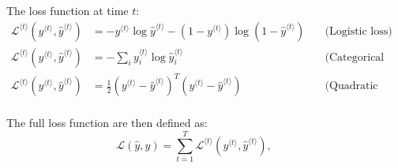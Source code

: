 \documentclass[a4paper, 12pt]{report}
\begin{document}
The loss function at time $t$:
\begin{equation}
\begin{array}{lll}
\mathcal L^{\langle t\rangle}(y^{\langle t\rangle}, \hat y^{\langle t\rangle}) &= -y^{\langle t\rangle}\log\hat y^{\langle t\rangle} - (1-y^{\langle t\rangle})\log(1-\hat y^{\langle t\rangle})\quad&\text{(Logistic loss)} \\
\mathcal L^{\langle t\rangle}(y^{\langle t\rangle}, \hat y^{\langle t\rangle}) &= -\sum_i y_i^{\langle t\rangle}\log\hat y_i^{\langle t\rangle}\quad&\text{(Categorical cross-entropy)} \\
\mathcal L^{\langle t\rangle}(y^{\langle t\rangle}, \hat y^{\langle t\rangle}) &= \frac{1}{2}(y^{\langle t\rangle}-\hat y^{\langle t\rangle})^T(y^{\langle t\rangle}-\hat y^{\langle t\rangle})&\text{(Quadratic Loss)} \\
\end{array}
\end{equation}

The full loss function are then defined as:
\begin{equation}
\mathcal L(\hat y, y) = \sum_{t=1}^{T}\mathcal L^{\langle t\rangle}(y^{\langle t\rangle}, \hat y^{\langle t\rangle}),\quad\quad
\end{equation}
\end{document}
